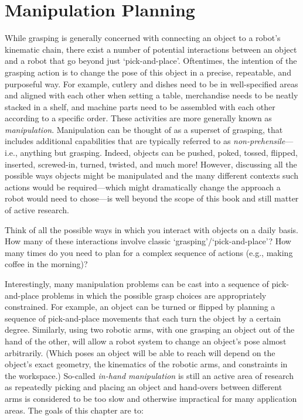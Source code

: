 \chapter{Manipulation Planning}\label{chap:manipulation}

While grasping is generally concerned with connecting an object to a robot's kinematic chain, there exist a number of potential interactions between an object and a robot that go beyond just `pick-and-place'.
Oftentimes, the intention of the grasping action is to change the pose of this object in a precise, repeatable, and purposeful way.
For example, cutlery and dishes need to be in well-specified areas and aligned with each other when setting a table, merchandise needs to be neatly stacked in a shelf, and machine parts need to be assembled with each other according to a specific order.
These activities are more generally known as \textsl{manipulation}.
Manipulation can be thought of as a superset of grasping, that includes additional capabilities that are typically referred to as \textsl{non-prehensile}---i.e., anything but grasping.
Indeed, objects can be pushed, poked, tossed, flipped, inserted, screwed-in, turned, twisted, and much more!
However, discussing all the possible ways objects might be manipulated and the many different contexts such actions would be required---which might dramatically change the approach a robot would need to chose---is well beyond the scope of this book and still matter of active research.

\begin{mdframed}
Think of all the possible ways in which you interact with objects on a daily basis. How many of these interactions involve classic `grasping'/`pick-and-place'? How many times do you need to plan for a complex sequence of actions (e.g., making coffee in the morning)?
\end{mdframed}

Interestingly, many manipulation problems can be cast into a sequence of pick-and-place problems in which the possible grasp choices are appropriately constrained. For example, an object can be turned or flipped by planning a sequence of pick-and-place movements that each turn the object by a certain degree. Similarly, using two robotic arms, with one grasping an object out of the hand of the other, will allow a robot system to change an object's pose almost arbitrarily. (Which poses an object will be able to reach will depend on the object's exact geometry, the kinematics of the robotic arms, and constraints in the workspace.) So-called \textsl{in-hand manipulation} is still an active area of research as repeatedly picking and placing an object and hand-overs between different arms is considered to be too slow and otherwise impractical for many application areas.
The goals of this chapter are to:

